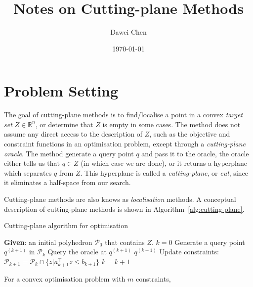 \documentclass[10pt,a4paper]{article}
\title{Notes on Cutting-plane Methods}
\author{Dawei Chen}
\date{\today}
\begin{document}
\maketitle

\section{Problem Setting}
\label{sec:problem}

The goal of cutting-plane methods is to find/localise a point in a convex \textit{target set} $Z \in \mathbb{R}^n$,
or determine that $Z$ is empty in some cases. 
The method does not assume any direct access to the description of $Z$,
such as the objective and constraint functions in an optimisation problem, except through a \textit{cutting-plane oracle}.
The method generate a query point $q$ and pass it to the oracle, 
the oracle either tells us that $q \in Z$ (in which case we are done), or it returns a hyperplane which separates $q$ from $Z$.
This hyperplane is called a \textit{cutting-plane}, or \textit{cut}, since it eliminates a half-space from our search.

Cutting-plane methods are also knows as \textit{localisation} methods. 
A conceptual description of cutting-plane methods is shown in Algorithm~\ref{alg:cutting-plane}.


\begin{algorithm}[htbp]
\caption{Cutting-plane algorithm for optimisation}
\label{alg:cutting-plane}
\begin{algorithmic}[1]
\STATE \textbf{Given}: an initial polyhedron $\mathcal{P}_0$ that contains $Z$.
\STATE $k = 0$
\REPEAT
    \STATE Generate a query point $q^{(k+1)}$ in $\mathcal{P}_k$
    \STATE Query the oracle at $q^{(k+1)}$
        \RETURN $q^{(k+1)}$
        \STATE Update constraints: $\mathcal{P}_{k+1} = \mathcal{P}_k \cap \{z | a_{k+1}^\top z \le b_{k+1} \}$
    \ENDIF
    \STATE $k = k + 1$
\end{algorithmic}
\end{algorithm}


For a convex optimisation problem with $m$ constraints,
\end{document}
